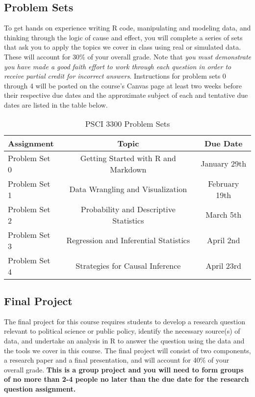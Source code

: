 \documentclass[12pt,]{article}
\begin{document}
\hypertarget{problem-sets}{%
\subsection{Problem Sets}\label{problem-sets}}

\noindent To get hands on experience writing R code, manipulating and
modeling data, and thinking through the logic of cause and effect, you
will complete a series of sets that ask you to apply the topics we cover
in class using real or simulated data. These will account for 30\% of
your overall grade. Note that \emph{you must demonstrate you have made a
good faith effort to work through each question in order to receive
partial credit for incorrect answers}. Instructions for problem sets 0
through 4 will be posted on the course's Canvas page at least two weeks
before their respective due dates and the approximate subject of each
and tentative due dates are listed in the table below.

\begin{table}[h]
\caption{PSCI 3300 Problem Sets}
\centering
\begin{tabular}[htp]{lcc}
\toprule
Assignment & Topic & Due Date\\
\midrule
Problem Set 0 & Getting Started with R and Markdown & January 29th\\
Problem Set 1 & Data Wrangling and Visualization & February 19th\\
Problem Set 2 & Probability and Descriptive Statistics & March 5th\\
Problem Set 3 & Regression and Inferential Statistics & April 2nd\\
Problem Set 4 & Strategies for Causal Inference & April 23rd\\
\bottomrule
\end{tabular}
\end{table}

\hypertarget{final-project}{%
\subsection{Final Project}\label{final-project}}

\noindent The final project for this course requires students to develop
a research question relevant to political science or public policy,
identify the necessary source(s) of data, and undertake an analysis in R
to answer the question using the data and the tools we cover in this
course. The final project will consist of two components, a research
paper and a final presentation, and will account for 40\% of your
overall grade. \textbf{This is a group project and you will need to form
groups of no more than 2-4 people no later than the due date for the
research question assignment.}
\end{document}
